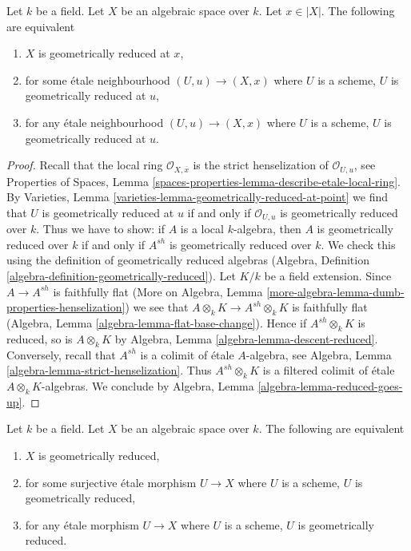 \begin{lemma}
\label{lemma-geometrically-reduced-at-point}
Let $k$ be a field. Let $X$ be an algebraic space over $k$.
Let $x \in |X|$. The following are equivalent
\begin{enumerate}
\item $X$ is geometrically reduced at $x$,
\item for some \'etale neighbourhood $(U, u) \to (X, x)$
where $U$ is a scheme, $U$ is geometrically reduced at $u$,
\item for any \'etale neighbourhood $(U, u) \to (X, x)$
where $U$ is a scheme, $U$ is geometrically reduced at $u$.
\end{enumerate}
\end{lemma}

\begin{proof}
Recall that the local ring $\mathcal{O}_{X, \overline{x}}$
is the strict henselization of $\mathcal{O}_{U, u}$, see
Properties of Spaces, Lemma
\ref{spaces-properties-lemma-describe-etale-local-ring}.
By Varieties, Lemma \ref{varieties-lemma-geometrically-reduced-at-point}
we find that $U$ is geometrically reduced at $u$ if and only
if $\mathcal{O}_{U, u}$ is geometrically reduced over $k$.
Thus we have to show: if $A$ is a local $k$-algebra, then
$A$ is geometrically reduced over $k$ if and only if
$A^{sh}$ is geometrically reduced over $k$.
We check this using the definition of geometrically reduced
algebras (Algebra, Definition \ref{algebra-definition-geometrically-reduced}).
Let $K/k$ be a field extension.
Since $A \to A^{sh}$ is faithfully flat
(More on Algebra, Lemma \ref{more-algebra-lemma-dumb-properties-henselization})
we see that
$A \otimes_k K \to A^{sh} \otimes_k K$ is faithfully flat
(Algebra, Lemma \ref{algebra-lemma-flat-base-change}).
Hence if $A^{sh} \otimes_k K$ is reduced, so is
$A \otimes_k K$ by Algebra, Lemma \ref{algebra-lemma-descent-reduced}.
Conversely, recall that $A^{sh}$ is a colimit of
\'etale $A$-algebra, see
Algebra, Lemma \ref{algebra-lemma-strict-henselization}.
Thus $A^{sh} \otimes_k K$ is a filtered
colimit of \'etale $A \otimes_k K$-algebras.
We conclude by Algebra, Lemma \ref{algebra-lemma-reduced-goes-up}.
\end{proof}

\begin{lemma}
\label{lemma-geometrically-reduced}
Let $k$ be a field. Let $X$ be an algebraic space over $k$.
The following are equivalent
\begin{enumerate}
\item $X$ is geometrically reduced,
\item for some surjective \'etale morphism $U \to X$ where $U$
is a scheme, $U$ is geometrically reduced,
\item for any \'etale morphism $U \to X$
where $U$ is a scheme, $U$ is geometrically reduced.
\end{enumerate}
\end{lemma}

